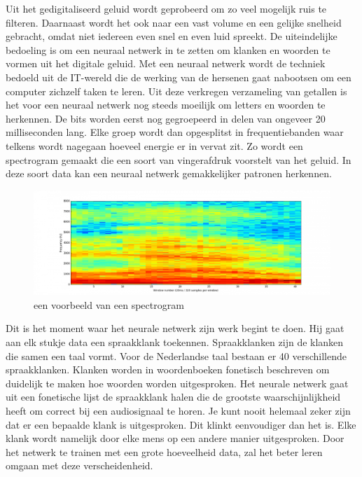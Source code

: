 Uit het gedigitaliseerd geluid wordt geprobeerd om zo veel mogelijk ruis te filteren. Daarnaast wordt het ook naar een vast volume en een gelijke snelheid gebracht, omdat niet iedereen even snel en even luid spreekt. De uiteindelijke bedoeling is om een neuraal netwerk in te zetten om klanken en woorden te vormen uit het digitale geluid. Met een neuraal netwerk wordt de techniek bedoeld uit de IT-wereld die de werking van de hersenen gaat nabootsen om een computer zichzelf taken te leren.
Uit deze verkregen verzameling van getallen is het voor een neuraal netwerk nog steeds moeilijk om letters en woorden te herkennen. De bits worden eerst nog gegroepeerd in delen van ongeveer 20 milliseconden lang. Elke groep wordt dan opgesplitst in frequentiebanden waar telkens wordt nagegaan hoeveel energie er in vervat zit. Zo wordt een spectrogram gemaakt die een soort van vingerafdruk voorstelt van het geluid. In deze soort data kan een neuraal netwerk gemakkelijker patronen herkennen.
\begin{figure}[h]
    \includegraphics[width=0.7\linewidth]{img/spectogram}
    \caption{een voorbeeld van een spectrogram \autocite{Vervoort2017}}
    \label{fig:spectrogram}
\end{figure}
Dit is het moment waar het neurale netwerk zijn werk begint te doen. Hij gaat aan elk stukje data een spraakklank toekennen. Spraakklanken zijn de klanken die samen een taal vormt. Voor de Nederlandse taal bestaan er 40 verschillende spraakklanken. Klanken worden in woordenboeken fonetisch beschreven om duidelijk te maken hoe woorden worden uitgesproken. Het neurale netwerk gaat uit een fonetische lijst de spraakklank halen die de grootste waarschijnlijkheid heeft om correct bij een audiosignaal te horen. Je kunt nooit helemaal zeker zijn dat er een bepaalde klank is uitgesproken. Dit klinkt eenvoudiger dan het is. Elke klank wordt namelijk door elke mens op een andere manier uitgesproken. Door het netwerk te trainen met een grote hoeveelheid data, zal het beter leren omgaan met deze verscheidenheid.

